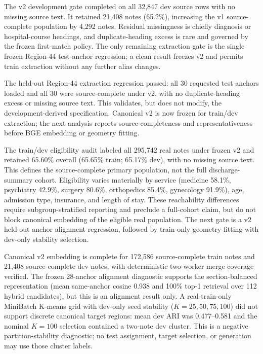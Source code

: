 \documentclass[11pt]{article}
\begin{document}
The v2 development gate completed on all 32,847 dev source rows with no missing source text.  It retained 21,408 notes (65.2\%), increasing the v1 source-complete population by 4,292 notes.  Residual missingness is chiefly diagnosis or hospital-course headings, and duplicate-heading excess is rare and governed by the frozen first-match policy.  The only remaining extraction gate is the single frozen Region-44 test-anchor regression; a clean result freezes v2 and permits train extraction without any further alias changes.

The held-out Region-44 extraction regression passed: all 30 requested test anchors loaded and all 30 were source-complete under v2, with no duplicate-heading excess or missing source text.  This validates, but does not modify, the development-derived specification.  Canonical v2 is now frozen for train/dev extraction; the next analysis reports source-completeness and representativeness before BGE embedding or geometry fitting.

The train/dev eligibility audit labeled all 295,742 real notes under frozen v2 and retained 65.60\% overall (65.65\% train; 65.17\% dev), with no missing source text.  This defines the source-complete primary population, not the full discharge-summary cohort.  Eligibility varies materially by service (medicine 58.1\%, psychiatry 42.9\%, surgery 80.6\%, orthopedics 85.4\%, gynecology 91.9\%), age, admission type, insurance, and length of stay.  These reachability differences require subgroup-stratified reporting and preclude a full-cohort claim, but do not block canonical embedding of the eligible real population.  The next gate is a v2 held-out anchor alignment regression, followed by train-only geometry fitting with dev-only stability selection.

Canonical v2 embedding is complete for 172,586 source-complete train notes and 21,408 source-complete dev notes, with deterministic two-worker merge coverage verified.  The frozen 28-anchor alignment diagnostic supports the section-balanced representation (mean same-anchor cosine 0.938 and 100\% top-1 retrieval over 112 hybrid candidates), but this is an alignment result only.  A real-train-only MiniBatch K-means grid with dev-only seed stability ($K=25,50,75,100$) did not support discrete canonical target regions: mean dev ARI was 0.477--0.581 and the nominal $K=100$ selection contained a two-note dev cluster.  This is a negative partition-stability diagnostic; no test assignment, target selection, or generation may use those cluster labels.
\end{document}
